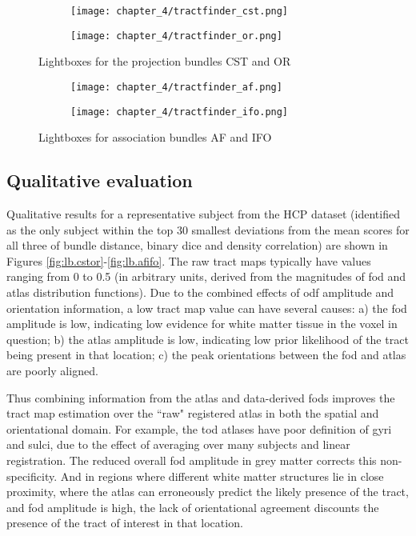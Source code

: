 \begin{figure}[htb!]
  \begin{subfigure}{\textwidth}
    \texttt{[image: chapter\_4/tractfinder\_cst.png]}
    \caption{}
  \end{subfigure}
  \begin{subfigure}{\textwidth}
    \texttt{[image: chapter\_4/tractfinder\_or.png]}
    \caption{}
  \end{subfigure}
  \caption{Lightboxes for the projection bundles CST and OR}
  \label{fig:lbcstor}
\end{figure}
\begin{figure}[htb!]
  \begin{subfigure}{\textwidth}
    \texttt{[image: chapter\_4/tractfinder\_af.png]}
    \caption{}
  \end{subfigure}
  \begin{subfigure}{\textwidth}
    \texttt{[image: chapter\_4/tractfinder\_ifo.png]}
    \caption{}
  \end{subfigure}
  \caption{Lightboxes for association bundles AF and IFO}
  \label{fig:lbcstor}
\end{figure}

\clearpage
\subsection{Qualitative evaluation}

Qualitative results for a representative subject from the HCP dataset (identified as the only subject within the top 30 smallest deviations from the mean scores for all three of bundle distance, binary \gls{dice} and density correlation) are shown in Figures \ref{fig:lb.cstor}-\ref{fig:lb.afifo}.
The raw tract maps typically have values ranging from 0 to 0.5 (in arbitrary units, derived from the magnitudes of \gls{fod} and atlas distribution functions).
Due to the combined effects of \gls{odf} amplitude and orientation information, a low tract map value can have several causes: a) the \gls{fod} amplitude is low, indicating low evidence for white matter tissue in the voxel in question; b) the atlas amplitude is low, indicating low prior likelihood of the tract being present in that location; c) the peak orientations between the \gls{fod} and atlas are poorly aligned.

Thus combining information from the atlas and data-derived \gls{fod}s improves the tract map estimation over the ``raw" registered atlas in both the spatial and orientational domain. For example, the \gls{tod} atlases have poor definition of gyri and sulci, due to the effect of averaging over many subjects and linear registration. The reduced overall \gls{fod} amplitude in grey matter corrects this non-specificity. And in regions where different white matter structures lie in close proximity, where the atlas can erroneously predict the likely presence of the tract, and \gls{fod} amplitude is high, the lack of orientational agreement discounts the presence of the tract of interest in that location.

